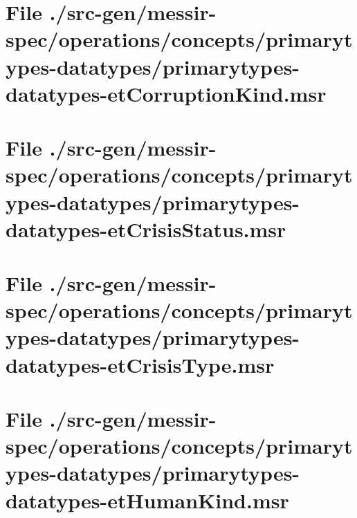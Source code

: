 \section[File /src-gen/messir-spec.../primarytypes-datatypes-etCorruptionKind.msr]{File ./src-gen/messir-spec/operations/concepts/primarytypes-datatypes/primarytypes-datatypes-etCorruptionKind.msr}
\scriptsize

\normalsize
	
\section[File /src-gen/messir-spec.../primarytypes-datatypes-etCrisisStatus.msr]{File ./src-gen/messir-spec/operations/concepts/primarytypes-datatypes/primarytypes-datatypes-etCrisisStatus.msr}
\scriptsize

\normalsize
	
\section[File /src-gen/messir-spec/operations.../primarytypes-datatypes-etCrisisType.msr]{File ./src-gen/messir-spec/operations/concepts/primarytypes-datatypes/primarytypes-datatypes-etCrisisType.msr}
\scriptsize

\normalsize
	
\section[File /src-gen/messir-spec/operations.../primarytypes-datatypes-etHumanKind.msr]{File ./src-gen/messir-spec/operations/concepts/primarytypes-datatypes/primarytypes-datatypes-etHumanKind.msr}
\scriptsize

\normalsize
	
